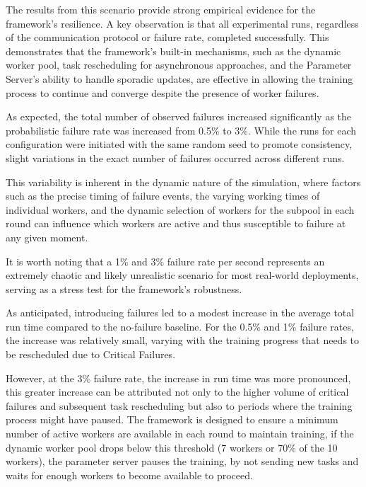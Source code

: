 The results from this scenario provide strong empirical evidence for the framework's resilience. A key observation is that all experimental runs, regardless of the communication protocol or failure rate, completed successfully. This demonstrates that the framework's built-in mechanisms, such as the dynamic worker pool, task rescheduling for asynchronous approaches, and the Parameter Server's ability to handle sporadic updates, are effective in allowing the training process to continue and converge despite the presence of worker failures.

As expected, the total number of observed failures increased significantly as the probabilistic failure rate was increased from 0.5\% to 3\%. While the runs for each configuration were initiated with the same random seed to promote consistency, slight variations in the exact number of failures occurred across different runs. 

This variability is inherent in the dynamic nature of the simulation, where factors such as the precise timing of failure events, the varying working times of individual workers, and the dynamic selection of workers for the subpool in each round can influence which workers are active and thus susceptible to failure at any given moment. 

It is worth noting that a 1\% and 3\% failure rate per second represents an extremely chaotic and likely unrealistic scenario for most real-world deployments, serving as a stress test for the framework's robustness.

As anticipated, introducing failures led to a modest increase in the average total run time compared to the no-failure baseline. For the 0.5\% and 1\% failure rates, the increase was relatively small, varying with the training progress that needs to be rescheduled due to Critical Failures. 

However, at the 3\% failure rate, the increase in run time was more pronounced, this greater increase can be attributed not only to the higher volume of critical failures and subsequent task rescheduling but also to periods where the training process might have paused. The framework is designed to ensure a minimum number of active workers are available in each round to maintain training, if the dynamic worker pool drops below this threshold (7 workers or 70\% of the 10 workers), the parameter server pauses the training, by not sending new tasks and waits for enough workers to become available to proceed.

